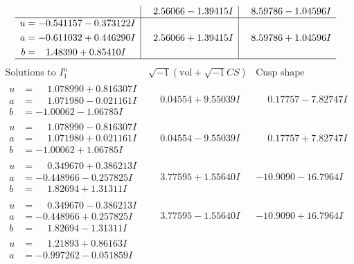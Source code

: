 \documentclass[1p]{elsarticle_modified}
\theoremstyle{definition}
\newcommand{\I}{\sqrt{-1}}
\begin{document}
$$\begin{array}{c|c|c}
 & \phantom{-}2.56066 - 1.39415 I & \phantom{-}8.59786 - 1.04596 I \\ \hline\begin{aligned}
u &= -0.541157 - 0.373122 I \\
a &= -0.611032 + 0.446290 I \\
b &= \phantom{-}1.48390 + 0.85410 I\end{aligned}
 & \phantom{-}2.56066 + 1.39415 I & \phantom{-}8.59786 + 1.04596 I\\
 \hline 
 \end{array}$$\newpage$$\begin{array}{c|c|c}  
\text{Solutions to }I^u_{1}& \I (\text{vol} + \sqrt{-1}CS) & \text{Cusp shape}\\
 \hline 
\begin{aligned}
u &= \phantom{-}1.078990 + 0.816307 I \\
a &= \phantom{-}1.071980 - 0.021161 I \\
b &= -1.00062 - 1.06785 I\end{aligned}
 & \phantom{-}0.04554 + 9.55039 I & \phantom{-}0.17757 - 7.82747 I \\ \hline\begin{aligned}
u &= \phantom{-}1.078990 - 0.816307 I \\
a &= \phantom{-}1.071980 + 0.021161 I \\
b &= -1.00062 + 1.06785 I\end{aligned}
 & \phantom{-}0.04554 - 9.55039 I & \phantom{-}0.17757 + 7.82747 I \\ \hline\begin{aligned}
u &= \phantom{-}0.349670 + 0.386213 I \\
a &= -0.448966 - 0.257825 I \\
b &= \phantom{-}1.82694 + 1.31311 I\end{aligned}
 & \phantom{-}3.77595 + 1.55640 I & -10.9090 - 16.7964 I \\ \hline\begin{aligned}
u &= \phantom{-}0.349670 - 0.386213 I \\
a &= -0.448966 + 0.257825 I \\
b &= \phantom{-}1.82694 - 1.31311 I\end{aligned}
 & \phantom{-}3.77595 - 1.55640 I & -10.9090 + 16.7964 I \\ \hline\begin{aligned}
u &= \phantom{-}1.21893 + 0.86163 I \\
a &= -0.997262 - 0.051859 I \\

\end{aligned}
\end{array}$$
\end{document}

